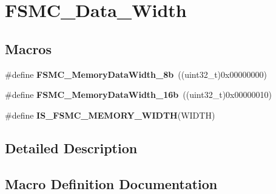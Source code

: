 \hypertarget{group___f_s_m_c___data___width}{}\section{F\+S\+M\+C\+\_\+\+Data\+\_\+\+Width}
\label{group___f_s_m_c___data___width}
\subsection*{Macros}
\begin{DoxyCompactItemize}
\item 
\hypertarget{group___f_s_m_c___data___width_ga5753e089830f19af70a724766e3c329f}{}\#define {\bfseries F\+S\+M\+C\+\_\+\+Memory\+Data\+Width\+\_\+8b}~((uint32\+\_\+t)0x00000000)\label{group___f_s_m_c___data___width_ga5753e089830f19af70a724766e3c329f}

\item 
\hypertarget{group___f_s_m_c___data___width_ga65d85c3072e6790ae760ca2248e46df6}{}\#define {\bfseries F\+S\+M\+C\+\_\+\+Memory\+Data\+Width\+\_\+16b}~((uint32\+\_\+t)0x00000010)\label{group___f_s_m_c___data___width_ga65d85c3072e6790ae760ca2248e46df6}

\item 
\#define {\bfseries I\+S\+\_\+\+F\+S\+M\+C\+\_\+\+M\+E\+M\+O\+R\+Y\+\_\+\+W\+I\+D\+T\+H}(W\+I\+D\+T\+H)
\end{DoxyCompactItemize}


\subsection{Detailed Description}


\subsection{Macro Definition Documentation}
\hypertarget{group___f_s_m_c___data___width_ga003d52b62f5950fb041f73f15ce20171}{}
